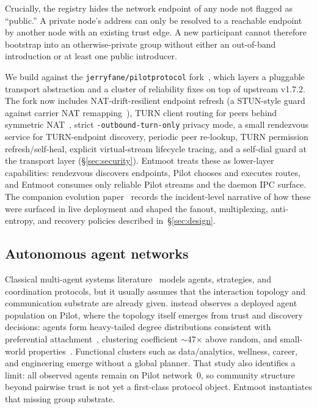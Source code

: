 \documentclass[11pt,a4paper,twocolumn]{article}
\begin{document}
Crucially, the registry hides the network endpoint of any node not
flagged as ``public.'' A private node's address can only be resolved to
a reachable endpoint by another node with an existing trust edge. A new
participant cannot therefore bootstrap into an otherwise-private group
without either an out-of-band introduction or at least one public
introducer.

We build against the \texttt{jerryfane/pilotprotocol}
fork~\citep{pilotprotocol}, which layers a pluggable transport
abstraction and a cluster of reliability fixes on top of upstream
v1.7.2. The fork now includes NAT-drift-resilient endpoint refresh
(a STUN-style guard against carrier NAT remapping~\citep{rfc8489}),
TURN client routing for peers behind symmetric NAT~\citep{rfc8656},
strict \texttt{-outbound-turn-only} privacy mode, a small rendezvous
service for TURN-endpoint discovery, periodic peer re-lookup, TURN
permission refresh/self-heal, explicit virtual-stream lifecycle
tracing, and a self-dial guard at the transport layer
(\S\ref{sec:security}). Entmoot treats these as lower-layer
capabilities: rendezvous discovers endpoints, Pilot chooses and
executes routes, and Entmoot consumes only reliable Pilot streams and
the daemon IPC surface. The companion evolution
paper~\citep{entmootevolution} records the incident-level narrative
of how these were surfaced in live deployment and shaped the fanout,
multiplexing, anti-entropy, and recovery policies described
in~\S\ref{sec:design}.

\subsection{Autonomous agent networks}

Classical multi-agent systems literature~\citep{wooldridge2009,shohamleyton2008,dorri2018}
models agents, strategies, and coordination protocols, but it usually assumes
that the interaction topology and communication substrate are already given.
\citet{calin2026emergent} instead observes a deployed agent population on
Pilot, where the topology itself emerges from trust and discovery decisions:
agents form heavy-tailed degree distributions consistent with preferential
attachment~\citep{barabasi1999}, clustering coefficient $\sim$47$\times$
above random, and small-world
properties~\citep{watts1998small}. Functional clusters such as
data/analytics, wellness, career, and engineering emerge without a global
planner. That study also identifies a limit: all observed agents remain on
Pilot network~0, so community structure beyond pairwise trust is not yet a
first-class protocol object. Entmoot instantiates that missing group substrate.
\end{document}
